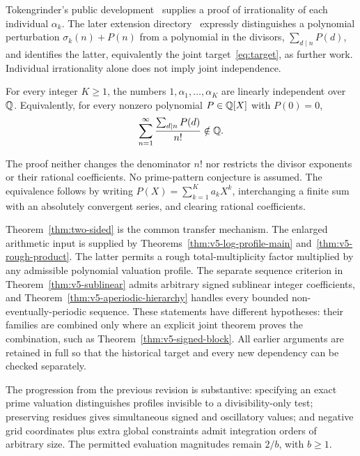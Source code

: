 Tokengrinder's public development~\cite{TG} supplies a proof of
irrationality of each individual $\alpha_k$. The later extension
directory~\cite{TGgen} expressly distinguishes a polynomial perturbation
$\sigma_k(n)+P(n)$ from a polynomial in the divisors,
$\sum_{d\mid n}P(d)$, and identifies the latter, equivalently the joint
target~\eqref{eq:target}, as further work. Individual irrationality
alone does not imply joint independence.

\begin{theorem}\label{thm:main}
For every integer $K\geq1$, the numbers
$1,\alpha_1,\ldots,\alpha_K$ are linearly independent over $\mathbb Q$.
Equivalently, for every nonzero polynomial $P\in\mathbb Q[X]$ with $P(0)=0$,
\begin{equation}\label{eq:polydivisor}
 \sum_{n=1}^{\infty}\frac{\sum_{d\mid n}P(d)}{n!}\notin\mathbb Q.
\end{equation}
\end{theorem}

The proof neither changes the denominator $n!$ nor restricts the
divisor exponents or their rational coefficients. No prime-pattern
conjecture is assumed. The equivalence follows by writing
$P(X)=\sum_{k=1}^K a_kX^k$, interchanging a finite sum with an absolutely
convergent series, and clearing rational coefficients.

Theorem~\ref{thm:two-sided} is the common transfer mechanism.
The enlarged arithmetic input is supplied by
Theorems~\ref{thm:v5-log-profile-main} and~\ref{thm:v5-rough-product}.
The latter permits a rough total-multiplicity factor multiplied by any
admissible polynomial valuation profile. The separate sequence criterion
in Theorem~\ref{thm:v5-sublinear} admits arbitrary signed sublinear
integer coefficients, and Theorem~\ref{thm:v5-aperiodic-hierarchy}
handles every bounded non-eventually-periodic sequence.
These statements have different hypotheses: their families are combined
only where an explicit joint theorem proves the combination, such as
Theorem~\ref{thm:v5-signed-block}.
All earlier arguments are retained in full so that the historical target
and every new dependency can be checked separately.

The progression from the previous revision is substantive: specifying
an exact prime valuation distinguishes profiles invisible to a
divisibility-only test; preserving residues gives simultaneous signed
and oscillatory values; and negative grid coordinates plus extra
global constraints admit integration orders of arbitrary size.
The permitted evaluation magnitudes remain $2/b$, with $b\geq1$.


